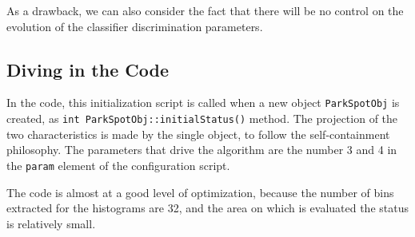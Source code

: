 	As a drawback, we can also consider the fact that there will be no control on
	the evolution of the classifier discrimination parameters.
	
	\subsection{Diving in the Code}
	In the code, this initialization script is called when a new object
	\verb+ParkSpotObj+ is created, as \verb+int ParkSpotObj::initialStatus()+
	method. The projection of the two characteristics is made by the single object,
	to follow the self-containment philosophy. The parameters that drive the
	algorithm are the number 3 and 4 in the \verb+param+ element of the
	configuration script.
	
	The code is almost at a good level of optimization, because the number of bins
	extracted for the histograms are 32, and the area on which is evaluated the
	status is relatively small.
